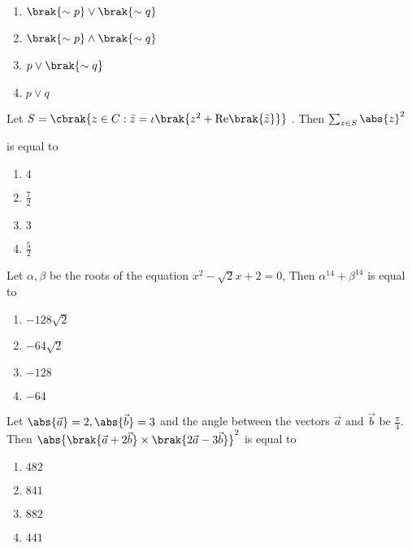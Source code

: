 	\hfill{}

\begin{multicols}{4}
\begin{enumerate}
\item $\brak{\sim p}\lor\brak{\sim q}$
\item $\brak{\sim p}\land\brak{\sim q}$
\item $p \lor\brak{\sim q}$
\item $p \lor q$
\end{enumerate}
\end{multicols}

\item Let $S=\cbrak{z \in C:\Bar{z}=\iota\brak{z^2+\text{Re}\brak{\Bar{z}}}}$ . Then $\sum_{z\in S}^{} {\abs{z}}^2$

is equal to \hfill{}

\begin{multicols}{4}
\begin{enumerate}
\item $4$
\item $\frac{7}{2}$
\item $3$
\item $\frac{5}{2}$
\end{enumerate}
\end{multicols}

\item Let $\alpha , \beta$ be the roots of the equation $x^2- \sqrt{2}x+2=0$, Then $\alpha^{14}+\beta^{14}$ is equal to
	
	\hfill{}

\begin{multicols}{4}
\begin{enumerate}
\item $-128\sqrt{2}$
\item $-64\sqrt{2}$
\item $-128$
\item $-64$
\end{enumerate}
\end{multicols}

\item Let $\abs{\Vec{a}}=2,\abs{\Vec{b}}=3$ and the angle between the vectors $\Vec{a} \text{ and } \Vec{b} \text{ be } \frac{\pi}{4}$. Then ${\abs{\brak{\Vec{a}+2\Vec{b}}\times\brak{2\Vec{a}-3\Vec{b}}}}^2$ is equal to\hfill{}

\begin{multicols}{4}
\begin{enumerate}
\item $482$
\item $841$
\item $882$
\item $441$
\end{enumerate}
\end{multicols}

